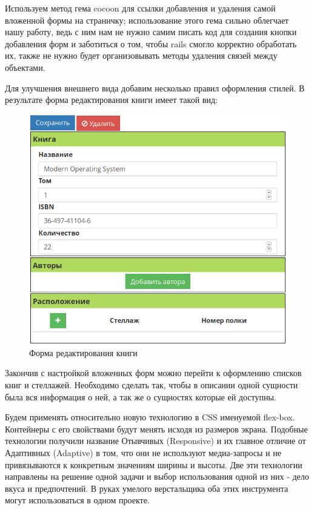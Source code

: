 Используем метод гема cocoon для ссылки добавления и удаления
самой вложенной формы на
страничку; использование этого гема сильно
облегчает нашу работу, ведь
с ним нам не нужно самим писать код для создания кнопки добавления форм и
заботиться о том, чтобы rails смогло корректно обработать их,
также не нужно будет организовывать методы удаления связей между объектами.

Для улучшения внешнего вида добавим несколько правил оформления стилей.
В результате форма редактирования книги имеет такой вид:
\begin{figure}[ht!]
\begin{center}
\includegraphics[scale=0.75]{images/book-form2.png}
\end{center}
\vspace*{-8mm}
\caption{Форма редактирования книги} \label{fig:book-form2}
\end{figure}

Закончив с настройкой вложенных форм можно перейти к оформлению списков
книг и стеллажей. Необходимо сделать так, чтобы в описании одной сущности
была вся информация о ней, а так же о сущностях которые ей доступны.

Будем применять относительно новую технологию в CSS именуемой flex-box.
Контейнеры с его свойствами будут менять исходя из размеров экрана.
Подобные технологии получили название Отывчивых (Responsive) и их
главное отличие от Адаптивных (Adaptive) в том, что они не используют
медиа-запросы и не привязываются к конкретным значениям ширины и высоты.
Две эти технологии направлены на решение одной задачи и выбор использования
одной из них - дело вкуса и предпочтений. В руках умелого верстальщика
оба этих инструмента могут использоваться в одном проекте.

